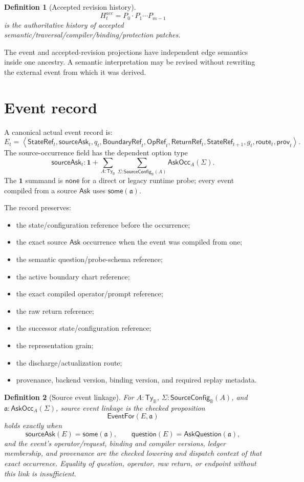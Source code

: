 \documentclass[11pt,oneside]{article}
\newtheorem{definition}{Definition}[section]
\newcommand{\B}{\mathbb B}
\newcommand{\StateRef}{\mathsf{StateRef}}
\newcommand{\ReturnRef}{\mathsf{ReturnRef}}
\newcommand{\OpRef}{\mathsf{OpRef}}
\newcommand{\BoundaryRef}{\mathsf{BoundaryRef}}
\newcommand{\AskRef}{\mathfrak a}
\begin{document}
\begin{definition}[Accepted revision history]
\[
\boxed{
H_t^{acc}=P_0\cdot P_1\cdots P_{m-1}
}
\]
is the authoritative history of accepted semantic/traversal/compiler/binding/protection patches.
\end{definition}

The event and accepted-revision projections have independent edge semantics inside one ancestry.
A semantic interpretation may be revised without rewriting the external event from which it was
derived.

\section{Event record}

A canonical actual event record is:
\[
\boxed{
E_t=
\left\langle
\StateRef_t,
\mathsf{sourceAsk}_t,
q_t,
\BoundaryRef_t,
\OpRef_t,
\ReturnRef_t,
\StateRef_{t+1},
g_t,
\mathsf{route}_t,
\mathsf{prov}_t
\right\rangle.
}
\]
The source-occurrence field has the dependent option type
\[
\boxed{
\mathsf{sourceAsk}_t:
\mathbf 1+
\sum_{A:\mathsf{Ty}_{\B}}\sum_{\Sigma:\mathsf{SourceConfig}_{\B}(A)}
\mathsf{AskOcc}_A(\Sigma).
}
\]
The \(\mathbf 1\) summand is \(\mathsf{none}\) for a direct or legacy runtime probe; every event
compiled from a source \(\mathsf{Ask}\) uses \(\mathsf{some}(\AskRef)\).

The record preserves:
\begin{itemize}
\item the state/configuration reference before the occurrence;
\item the exact source \(\mathsf{Ask}\) occurrence when the event was compiled from one;
\item the semantic question/probe-schema reference;
\item the active boundary chart reference;
\item the exact compiled operator/prompt reference;
\item the raw return reference;
\item the successor state/configuration reference;
\item the representation grain;
\item the discharge/actualization route;
\item provenance, backend version, binding version, and required replay metadata.
\end{itemize}

\begin{definition}[Source event linkage]\label{def:event-for-ask}
For \(A:\mathsf{Ty}_{\B}\), \(\Sigma:\mathsf{SourceConfig}_{\B}(A)\), and
\(\AskRef:\mathsf{AskOcc}_A(\Sigma)\), source event linkage is the checked proposition
\[
\boxed{
\mathsf{EventFor}(E,\AskRef)
}
\]
holds exactly when
\[
\mathsf{sourceAsk}(E)=\mathsf{some}(\AskRef),
\qquad
\mathsf{question}(E)=\mathsf{AskQuestion}(\AskRef),
\]
and the event's operator/request, binding and compiler versions, ledger membership, and
provenance are the checked lowering and dispatch context of that exact occurrence.  Equality of
question, operator, raw return, or endpoint without this link is insufficient.
\end{definition}
\end{document}
